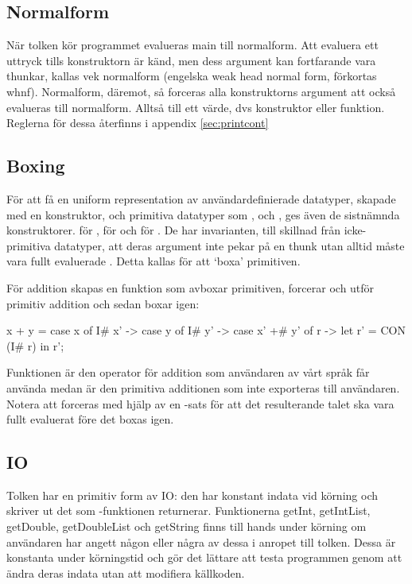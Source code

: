 \documentclass[../Core]{subfiles}
\begin{document}

\subsection{Normalform}
\label{sec:whnf}
\label{sec:nf}

När tolken kör programmet evalueras main till normalform.
Att evaluera ett uttryck tills konstruktorn är känd, men dess argument kan 
fortfarande vara thunkar, kallas vek normalform 
(engelska weak head normal form, förkortas whnf). Normalform, däremot, så
forceras alla konstruktorns argument att också evalueras till normalform.
Alltså till ett värde, dvs konstruktor eller funktion. Reglerna för dessa
återfinns i appendix \ref{sec:printcont}

\subsection{Boxing}

För att få en uniform representation av användardefinierade datatyper, skapade
med en konstruktor, och primitiva datatyper som ,  och , ges även 
de sistnämnda konstruktorer.  för ,  för  och 
 för . De har invarianten, till skillnad från icke-primitiva datatyper, 
att deras argument inte pekar på en thunk utan alltid måste vara fullt evaluerade  \cite{santos}. 
Detta kallas för att `boxa' primitiven.

    För addition skapas en funktion som avboxar primitiven,
forcerar och utför primitiv addition och sedan boxar igen:

\begin{codeEx}
x + y = case x of 
    { I# x' -> case y of
        { I# y' -> case x' +# y' of
            { r -> let r' = CON (I# r) in  r'}}};
\end{codeEx}

Funktionen \ic{+} är den operator för addition som användaren av vårt språk 
får använda medan \ic{+\#} är den primitiva additionen som inte exporteras till 
användaren. Notera att 
forceras med hjälp av en -sats för att det resulterande talet ska vara fullt
evaluerat före det boxas igen.

\subsection{IO}
Tolken har en primitiv form av IO: den har konstant indata vid körning och
skriver ut det som -funktionen returnerar. Funktionerna getInt, 
getIntList, getDouble, getDoubleList och getString finns
till hands under körning om användaren har angett någon eller några av dessa
i anropet till tolken. Dessa är konstanta under körningstid och gör det
lättare att testa programmen genom att ändra deras indata utan att modifiera
källkoden.
\end{document}
